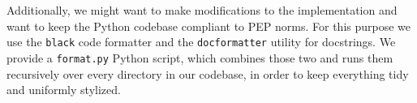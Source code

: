 Additionally, we might want to make modifications to the implementation and want to keep the Python codebase compliant to PEP norms.
For this purpose we use the \verb|black| code formatter and the \verb|docformatter| utility for docstrings.
We provide a \verb|format.py| Python script, which combines those two and runs them recursively over every directory in our codebase, in order to keep everything tidy and uniformly stylized.

